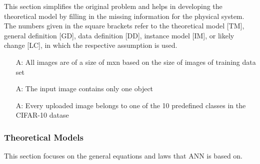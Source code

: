 \documentclass[12pt]{article}
\newcounter{assumpnum} %
\begin{document}
This section simplifies the original problem and helps in developing the
theoretical model by filling in the missing information for the physical system.
The numbers given in the square brackets refer to the theoretical model [TM],
general definition [GD], data definition [DD], instance model [IM], or likely
change [LC], in which the respective assumption is used.

\begin{itemize}

\item[A\refstepcounter{assumpnum}\theassumpnum \label{size}:]
All images are of a size of mxn based on the size of images of training data set
\item[A\refstepcounter{assumpnum}\theassumpnum \label{object}:]
 The input image contains only one object
 \item[A\refstepcounter{assumpnum}\theassumpnum \label{class}:]
 Every uploaded image belongs to one of the 10 predefined classes in the CIFAR-10 datase

\end{itemize}

\subsubsection{Theoretical Models}\label{sec_theoretical}



This section focuses on the general equations and laws that ANN is based
on.  
\end{document}
